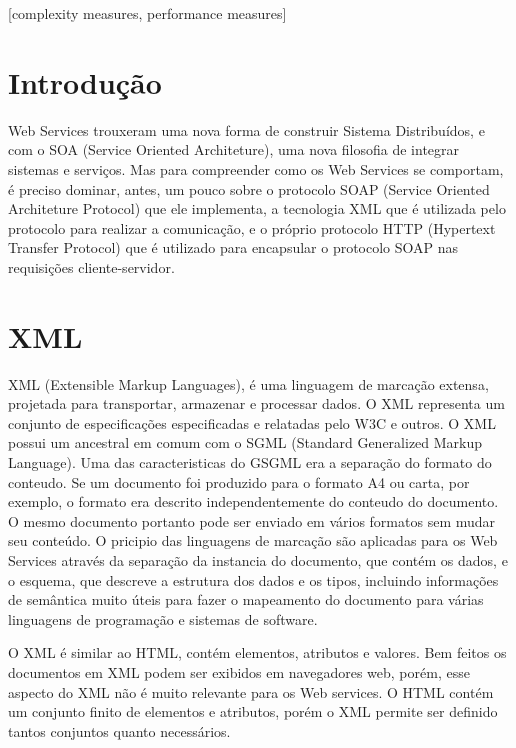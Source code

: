 \documentclass{acm_proc_article-sp}
\begin{document}
[complexity measures, performance measures]



\section{Introdução}
		Web Services trouxeram uma nova forma de construir Sistema Distribuídos, e com o SOA (Service Oriented Architeture), uma nova filosofia de integrar sistemas e serviços. Mas para compreender como os Web Services se comportam, é preciso dominar, antes, um pouco sobre o protocolo SOAP (Service Oriented Architeture Protocol) que ele implementa, a tecnologia XML que é utilizada pelo protocolo para realizar a comunicação, e o próprio protocolo HTTP (Hypertext Transfer Protocol) que é utilizado para encapsular o protocolo SOAP nas requisições cliente-servidor.
		
		
\section{XML}
		XML (Extensible Markup Languages), é uma linguagem de marcação extensa, projetada para transportar, armazenar e processar dados. O XML representa um conjunto de especificações especificadas e relatadas pelo W3C e outros. O XML possui um ancestral em comum com o SGML (Standard Generalized Markup Language). Uma das caracteristicas do GSGML era a separação do formato do conteudo. Se um documento foi produzido para o formato A4 ou carta, por exemplo, o formato era descrito independentemente do conteudo do documento. O mesmo documento portanto pode ser enviado em vários formatos sem mudar seu conteúdo. O pricipio das linguagens de marcação são aplicadas para os Web Services através da separação da instancia do documento, que contém os dados, e o esquema, que descreve a estrutura dos dados e os tipos, incluindo informações de semântica muito úteis para fazer o mapeamento do documento para várias linguagens de programação e sistemas de software. 
		
		O XML é similar ao HTML, contém elementos, atributos e valores. Bem feitos os documentos em XML podem ser exibidos em navegadores web, porém, esse aspecto do XML não é muito relevante para os Web services. O HTML contém um conjunto finito de elementos e atributos, porém o XML permite ser definido tantos conjuntos quanto necessários.
		
\end{document}
